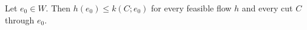 Let $e_0 \in W$. Then $h(e_0) \leq k(C; e_0)$ for every feasible flow $h$ and every cut $C$ through $e_0$.
